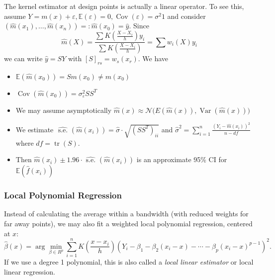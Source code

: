 \documentclass[11pt, %
	oneside, %
	english, %
	onehalfspacing, %
	]{article} %
\numberwithin{equation}{section}
\begin{document}
The kernel estimator at design points is actually a linear operator. To see this, assume $Y=m(x)+\varepsilon, \mathbb{E}(\varepsilon)=0, \operatorname{Cov}(\varepsilon)=\sigma^2 1$ and consider $\left(\hat{m}\left(x_1\right), \ldots, \hat{m}\left(x_n\right)\right)=:\hat{m}\left(x_0\right)=\hat{y}$. Since
\begin{equation*}
    \hat{m}(X) = \frac{\sum K \left( \frac{X - X_i}{h} \right) y_i}{\sum K \left( \frac{X - X_i}{h}\right)} = \sum w_i(X) y_i
\end{equation*}
we can write $\hat{y} = SY$ with $[S]_{rs} = w_s(x_r)$. We have
\begin{itemize}
    \item $\mathbb{E}(\hat{m}(x_0)) = S m(x_0) \neq m(x_0)$
    \item $\operatorname{Cov}(\hat{m}(x_0)) = \sigma^2_\varepsilon S S^T$
    \item We may assume asymptotically $\widehat{m}(x) \approx \mathcal{N}\Big(E(\widehat{m}(x)), \operatorname{Var}(\widehat{m}(x))\Big)$
    \item We estimate $\widehat{\text { s.e. }}\left(\hat{m}\left(x_i\right)\right)=\hat{\sigma} \cdot \sqrt{\left(S S^T\right)_{i i}}$ and  $\hat{\sigma}^2=\sum_{i=1}^n \frac{\left(Y_i-\widehat{m}\left(x_i\right)\right)^2}{n-d f}$ where $d f=\operatorname{tr}(S)$.
    \item Then $\widehat{m}\left(x_i\right) \pm 1.96 \cdot \widehat{\text { s.e. }}\left(\widehat{m}\left(x_i\right)\right)$ is an approximate 95\% CI for $\mathbb{E}(\hat{f}(x_i))$
\end{itemize}






\subsubsection*{Local Polynomial Regression}

Instead of calculating the average within a bandwidth (with reduced weights for far away points), we may also fit a weighted local polynomial regression, centered at $x$:
\begin{equation*}
    \hat{\beta}(x)=\arg \min_{\beta \in R^p}  \sum_{i=1}^n K\left(\frac{x-x_i}{h}\right)\left(Y_i-\beta_1-\beta_2\left(x_i-x\right)-\cdots-\beta_p\left(x_i-x\right)^{p-1}\right)^2.
\end{equation*}
If we use a degree 1 polynomial, this is also called a \emph{local linear estimator} or local linear regression.
\end{document}
